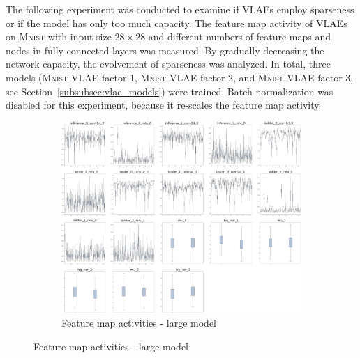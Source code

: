 The following experiment was conducted to examine if \acp{VLAE} employ sparseness or if the model has only too much capacity.
The feature map activity of \ac{VLAE}s on \textsc{Mnist} with input size $28\times 28$ and different numbers of feature maps and nodes in fully connected layers was measured.
By gradually decreasing the network capacity, the evolvement of sparseness was analyzed.
In total, three models (\textsc{Mnist}-\ac{VLAE}-factor-1, \textsc{Mnist}-\ac{VLAE}-factor-2, and \textsc{Mnist}-\ac{VLAE}-factor-3, see Section~\ref{subsubsec:vlae_models}) were trained.
Batch normalization was disabled for this experiment, because it re-scales the feature map activity.

\begin{figure}
    \centering
    \begin{subfigure}{.95\textwidth}
        \centering
        \includegraphics[width=\textwidth]{images/sparseness/encoder_fm1_fms.png}
        \caption{Feature map activities - large model}
    \end{subfigure}
\end{figure}
